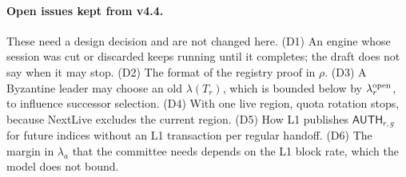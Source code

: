 \documentclass[11pt,a4paper]{article}
\newcommand{\tagg}[1]{\ensuremath{\mathsf{#1}}}
\begin{document}
\paragraph{Open issues kept from v4.4.}
These need a design decision and are not changed here.
(D1) An engine whose session was cut or discarded keeps running until it
completes; the draft does not say when it may stop.
(D2) The format of the registry proof in $\rho$.
(D3) A Byzantine leader may choose an old $\lambda(T_r)$, which is bounded
below by $\lambda^{\rm open}_r$, to influence successor selection.
(D4) With one live region, quota rotation stops, because NextLive
excludes the current region.
(D5) How L1 publishes $\tagg{AUTH}_{r,g}$ for future indices without an
L1 transaction per regular handoff.
(D6) The margin in $\lambda_a$ that the committee needs depends on the L1
block rate, which the model does not bound.
\end{document}
